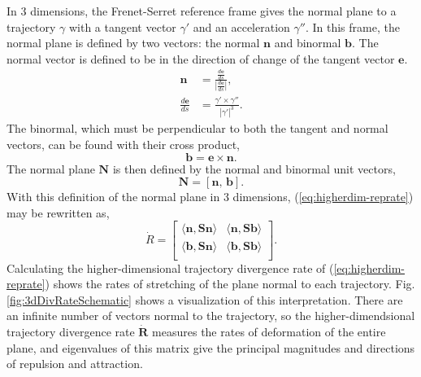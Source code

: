 \documentclass[twocolumn]{svjour3}
\begin{document}
In 3 dimensions, the Frenet-Serret reference frame gives the normal plane to a trajectory $\gamma$ with a tangent vector $\gamma'$ and an acceleration $\gamma''$. In this frame, the normal plane is defined by two vectors: the normal $\mathbf{n}$ and binormal $\mathbf{b}$. The normal vector is defined to be in the direction of change of the tangent vector $\mathbf{e}$.
\begin{equation}
\begin{aligned}
{\mathbf{n}} &= \frac{\tfrac{d{\mathbf{e}}}{ds}}{\left|\tfrac{d{\mathbf{e}}}{ds}\right|}, \\
\frac{d{\mathbf{e}}}{ds} &= \frac{\gamma'\times\gamma''}{\left|\gamma'\right|^3}.
\end{aligned}
\end{equation}
The binormal, which must be perpendicular to both the tangent and normal vectors, can be found with their cross product,
\begin{equation}
{\mathbf{b}} = {\mathbf{e}}\times{\mathbf{n}}.
\end{equation}
The normal plane $\mathbf{N}$ is then defined by the normal and binormal unit vectors,
\begin{equation}
\mathbf{N} = \left[{\mathbf{n}},\,{\mathbf{b}}\right].
\end{equation}
With this definition of the normal plane in 3 dimensions, (\ref{eq:higherdim-reprate}) may be rewritten as,
\begin{equation}
\dot{R} = \left[\begin{array}{cc}
\langle{\mathbf{n}}, \mathbf{S}{\mathbf{n}}\rangle & \langle{\mathbf{n}}, \mathbf{S}{\mathbf{b}}\rangle \\
\langle{\mathbf{b}}, \mathbf{S}{\mathbf{n}}\rangle & \langle{\mathbf{b}}, \mathbf{S}{\mathbf{b}}\rangle  \\
\end{array}\right].
\end{equation}
Calculating the higher-dimensional trajectory divergence rate of (\ref{eq:higherdim-reprate}) shows the rates of stretching of the plane normal to each trajectory. Fig. \ref{fig:3dDivRateSchematic} shows a visualization of this interpretation. There are an infinite number of vectors normal to the trajectory, so the higher-dimendsional trajectory divergence rate $\dot{\mathbf{R}}$ measures the rates of deformation of the entire plane, and eigenvalues of this matrix give the principal magnitudes and directions of repulsion and attraction.
\end{document}
